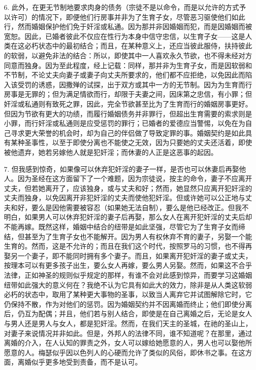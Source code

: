 6. 此外，在更无节制地要求肉身的债务（宗徒不是以命令，而是以允许的方式予以许可）的情况下，即便他们行房事并非为了生育子女，尽管恶习驱使他们如此行，然而婚姻保护他们免于奸淫或私通。因为那并非因婚姻而犯，而是因婚姻而被宽恕。因此，已婚者彼此不仅应在性行为本身中信守忠信，以生育子女——这是人类在这必朽状态中的最初结合；而且，在某种意义上，还应当彼此服侍，扶持彼此的软弱，以避免非法的结合：所以，即使其中一人喜欢永久节欲，也不得未经对方同意而独身。因为至此程度，经上记载：同样，那并非为生育子女，而是因软弱和不节制，不论丈夫向妻子或妻子向丈夫所要求的，他们都不应拒绝，以免因此而陷入该受罚的诱惑，因撒殚的试探，出于双方或其中一方的无节制。因为为生育而行房事是无罪的；但为满足情欲而行，却限于夫妻之间，因床第之忠信，有小罪；但奸淫或私通则有致死之罪，因此，完全节欲甚至比为了生育而行的婚姻房事更好。但因为节欲有更大的功绩，而履行婚姻债务并非罪行，但超出生育需要的索求则是小罪，而行奸淫或私通则是应受惩罚的罪行；已婚者的爱德应当警惕，以免在为自己寻求更大荣誉的机会时，却为自己的伴侣做了导致定罪的事。婚姻契约是如此具有某种圣事性，以至于即使分离也不能使之无效，因为只要她的丈夫还活着，即使被他遗弃，她若另嫁他人就是犯奸淫；而休妻的人正是这恶事的起因。\par

7. 但我感到惊奇，如果像可以休弃犯奸淫的妻子一样，是否也可以休妻后再娶他人。因为圣经在这方面留下了一个难题，因为宗徒说，按主的命令，妻子不应离开丈夫，但若她离开了，应该独身，或与丈夫和好；然而，她显然只应离开犯奸淫的丈夫而独身，以免因离开非犯奸淫的丈夫而使他犯奸淫。但或许她可以公正地与丈夫和好，要么是因他需要被容忍（如果她无法自制），要么是他已经改正。但我不明白，如果男人可以休弃犯奸淫的妻子后再娶，那么女人在离开犯奸淫的丈夫后却不能再嫁。既然这样，婚姻中结合的纽带是如此坚强，尽管它为了生育子女而缔结，但甚至为了生育子女也不能解开。因为男人有权休弃不育的妻子，另娶一个能生育的。然而，这是不允许的；而且在我们这个时代，按照罗马的习惯，也不得再娶另一个妻子，即不能同时拥有多个妻子。而且，如果离开犯奸淫的妻子或丈夫，按理本可以有更多孩子出生，要么女人再嫁，要么男人另娶。然而，如果这不合乎法律，正如神圣的规则似乎规定的那样，有谁不会对此感到惊异，而要学习这婚姻纽带如此强大的意义何在？我绝不认为它具有如此大的效力，除非是从人类这软弱必朽的状态中，取用了某种更大事物的圣事，以致当人离弃它并试图解除它时，它仍保持不散，作为对他们的惩罚。因为婚姻契约并不因离婚而终止；他们即使分离后，仍互为配偶；并且，他们若与别人结合，即使是在自己离婚之后，无论是女人与男人还是男人与女人，都是犯奸淫。然而，在我们天主的圣城，在祂的圣山上，对妻子来说情况并非如此。但是，外邦人的法律不同，谁不知道呢？在那里，通过离婚的介入，在人认知的罪责之外，女人可以嫁给她愿意的人，男人也可以娶他所愿意的人。梅瑟似乎因以色列人的心硬而允许了类似的风俗，即休书之事。在这方面，离婚似乎更多地受到责备，而不是认可。\par

